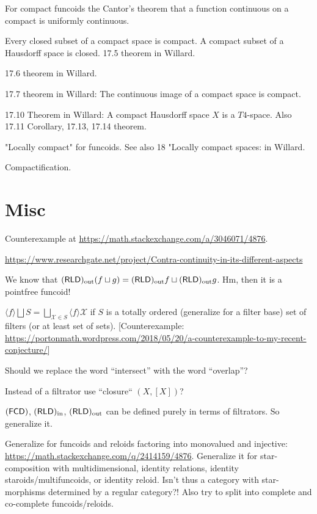 \documentclass{amsart}
\begin{document}
For compact funcoids the Cantor's theorem that a function continuous on a compact is uniformly continuous.

Every closed subset of a compact space is compact. A compact subset of a Hausdorff space is closed. 17.5 theorem in Willard.

17.6 theorem in Willard.

17.7 theorem in Willard: The continuous image of a compact space is compact.

17.10 Theorem in Willard: A compact Hausdorff space $X$ is a $T 4$-space. Also 17.11 Corollary, 17.13, 17.14 theorem.

"Locally compact" for funcoids. See also 18 "Locally compact spaces: in Willard.

Compactification.

\section{Misc}

Counterexample at \url{https://math.stackexchange.com/a/3046071/4876}.

\url{https://www.researchgate.net/project/Contra-continuity-in-its-different-aspects}

We know that $(\mathsf{RLD})_{\mathrm{out}}(f\sqcup g) = (\mathsf{RLD})_{\mathrm{out}} f\sqcup(\mathsf{RLD})_{\mathrm{out}} g$.
Hm, then it is a pointfree funcoid!

\begin{conjecture}
$\langle f \rangle \bigsqcup S = \bigsqcup_{\mathcal{X} \in S} \langle f
\rangle \mathcal{X}$ if $S$ is a totally ordered (generalize for a filter
base) set of filters (or at least set of sets).
[Counterexample: \url{https://portonmath.wordpress.com/2018/05/20/a-counterexample-to-my-recent-conjecture/}]
\end{conjecture}

Should we replace the word ``intersect'' with the word ``overlap''?

Instead of a filtrator use ``closure`` $(X,[X])$?

$(\mathsf{FCD})$, $(\mathsf{RLD})_{\mathrm{in}}$, $(\mathsf{RLD})_{\mathrm{out}}$ can be defined purely in terms of filtrators.
So generalize it.

Generalize for funcoids and reloids factoring into monovalued and injective:\\
\url{https://math.stackexchange.com/q/2414159/4876}.
Generalize it for star-composition with multidimensional, identity relations, identity staroids/multifuncoids, or identity reloid.
Isn't thus a category with star-morphisms determined by a regular category?!
Also try to split into complete and co-complete funcoids/reloids.
\end{document}
